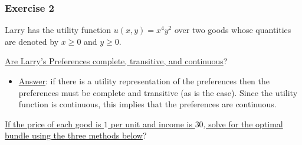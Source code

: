 \documentclass{article}
\begin{document}
\subsubsection{Exercise 2}
Larry has the utility function $u(x,y)=x^{4}y^{2}$ over two goods whose quantities are denoted by $x \geq 0$ and $y \geq 0$. \par \vspace{0.3em}
  \underline{Are Larry's Preferences complete, transitive, and continuous}?
  \begin{itemize}
    \item  \underline{Answer}: if there is a utility representation of the preferences then the preferences must be complete and transitive (as is the case). Since the utility function is continuous, this implies that the preferences are continuous.
  \end{itemize}
  \par
  \underline{If the price of each good is $1$ per unit and income is $30$, solve for the optimal bundle using the three methods below}?
\end{document}
